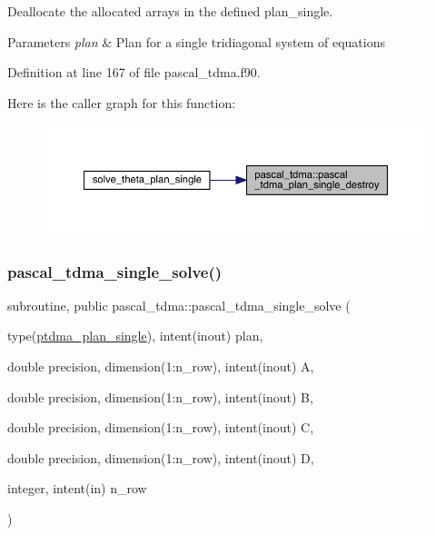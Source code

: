 Deallocate the allocated arrays in the defined plan\+\_\+single. 


\begin{DoxyParams}{Parameters}
{\em plan} & Plan for a single tridiagonal system of equations \\
\hline
\end{DoxyParams}


Definition at line 167 of file pascal\+\_\+tdma.\+f90.

Here is the caller graph for this function\+:
\nopagebreak
\begin{figure}[H]
\begin{center}
\leavevmode
\includegraphics[width=350pt]{namespacepascal__tdma_adb04e59c740ce6c4b9518dd86eaeb594_icgraph}
\end{center}
\end{figure}
\mbox{\label{namespacepascal__tdma_ab14e132231d4b53fd65dd333ccc85a50}} 
\subsubsection{\texorpdfstring{pascal\_tdma\_single\_solve()}{pascal\_tdma\_single\_solve()}}
{\footnotesize\ttfamily subroutine, public pascal\+\_\+tdma\+::pascal\+\_\+tdma\+\_\+single\+\_\+solve (\begin{DoxyParamCaption}\item[{type(\mbox{\hyperlink{structpascal__tdma_1_1ptdma__plan__single}{ptdma\+\_\+plan\+\_\+single}}), intent(inout)}]{plan,  }\item[{double precision, dimension(1\+:n\+\_\+row), intent(inout)}]{A,  }\item[{double precision, dimension(1\+:n\+\_\+row), intent(inout)}]{B,  }\item[{double precision, dimension(1\+:n\+\_\+row), intent(inout)}]{C,  }\item[{double precision, dimension(1\+:n\+\_\+row), intent(inout)}]{D,  }\item[{integer, intent(in)}]{n\+\_\+row }\end{DoxyParamCaption})}



